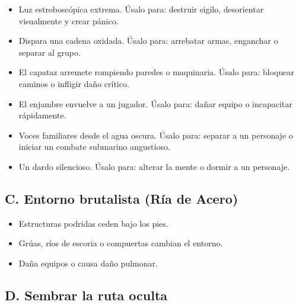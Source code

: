 \begin{itemize}
  \item {} Luz estroboscópica extrema. Úsalo para: destruir sigilo, desorientar visualmente y crear pánico.
  \item {} Dispara una cadena oxidada. Úsalo para: arrebatar armas, enganchar o separar al grupo.
  \item {} El capataz arremete rompiendo paredes o maquinaria. Úsalo para: bloquear caminos o infligir daño crítico.
  \item {} El enjambre envuelve a un jugador. Úsalo para: dañar equipo o incapacitar rápidamente.
  \item {} Voces familiares desde el agua oscura. Úsalo para: separar a un personaje o iniciar un combate submarino angustioso.
  \item {} Un dardo silencioso. Úsalo para: alterar la mente o dormir a un personaje.
\end{itemize}

\subsection{C. Entorno brutalista (Ría de Acero)}

\begin{itemize}
  \item {} Estructuras podridas ceden bajo los pies.
  \item {} Grúas, ríos de escoria o compuertas cambian el entorno.
  \item {} Daña equipos o causa daño pulmonar.
\end{itemize}

\subsection{D. Sembrar la ruta oculta}

